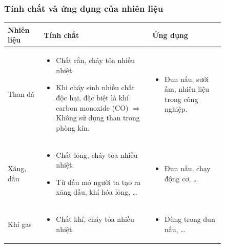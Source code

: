 \documentclass[Main.tex]{subfiles}
\begin{document}
\begin{kienthuccannho}
	\subsubsection{Tính chất và ứng dụng của nhiên liệu}
	\begin{center}
		\renewcommand{\arraystretch}{1.15}
		\begin{tabular}{|C{0.14\linewidth}|L{0.42\linewidth}|L{0.28\linewidth}|}
			\hline
			\textbf{Nhiên liệu} & \textbf{Tính chất} & \textbf{Ứng dụng} \\
			\hline
			Than đá
			&
			\begin{itemize}
				\item Chất rắn, cháy tỏa nhiều nhiệt.
				\item Khi cháy sinh nhiều chất độc hại, đặc biệt là khí carbon monoxide (CO) $\Rightarrow$ Không sử dụng than trong phòng kín.
			\end{itemize}
			&
			\begin{itemize}
				\item Đun nấu, sưởi ấm, nhiên liệu trong công nghiệp.
			\end{itemize}
			\\
			\hline
			Xăng, dầu
			&
			\begin{itemize}
				\item Chất lỏng, cháy tỏa nhiều nhiệt.
				\item Từ dầu mỏ người ta tạo ra xăng dầu, khí hóa lỏng, …
			\end{itemize}
			&
			\begin{itemize}
				\item Đun nấu, chạy động cơ, …
			\end{itemize}
			\\
			\hline
			Khí gas
			&
			\begin{itemize}
				\item Chất khí, cháy tỏa nhiều nhiệt.
			\end{itemize}
			&
			\begin{itemize}
				\item Dùng trong đun nấu, …
			\end{itemize}
			\\
			\hline
		\end{tabular}
	\end{center}

\end{kienthuccannho}
\end{document}
